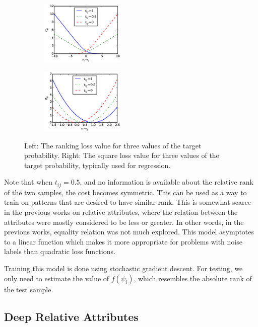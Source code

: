 \begin{figure}
    \centering
    \begin{subfigure}
        \centering
        \includegraphics[width=4cm]{fig2-2/fig3.eps}
    \end{subfigure}
    \begin{subfigure}
        \centering
        \includegraphics[width=4cm]{fig2-2/fig3-reg.eps}
    \end{subfigure}
    \caption{Left: The ranking loss value for three values of the target probability. Right: The square loss value for three values of the target probability, typically used for regression.}
    \label{fig.2}
\end{figure}

Note that when $t_{ij} = 0.5$, and no information is available about the relative rank of the two samples, the cost becomes symmetric. This can be used as a way to train on patterns that are desired to have similar rank. This is somewhat scarce in the previous works on relative attributes, where the relation between the attributes were mostly considered to be less or greater. In other words, in the previous works, equality relation was not much explored.
This model asymptotes to a linear function which makes it more appropriate for problems with noise labels than quadratic loss functions.

Training this model is done using stochastic gradient descent.%
For testing, we only need to estimate the value of $f(\psi_i)$, which resembles the absolute rank of the test sample.

\subsection{Deep Relative Attributes}\label{sec3.2}

